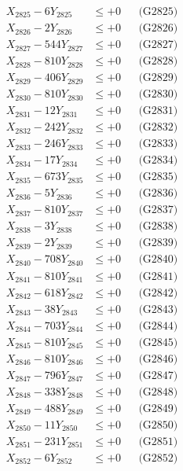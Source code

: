 \documentclass[a4paper,10pt]{article}
\begin{document}
{\begin{align}
X_{2825} - 6Y_{2825} &\leq +0 && \text{(G2825)} \\
X_{2826} - 2Y_{2826} &\leq +0 && \text{(G2826)} \\
X_{2827} - 544Y_{2827} &\leq +0 && \text{(G2827)} \\
X_{2828} - 810Y_{2828} &\leq +0 && \text{(G2828)} \\
X_{2829} - 406Y_{2829} &\leq +0 && \text{(G2829)} \\
X_{2830} - 810Y_{2830} &\leq +0 && \text{(G2830)} \\
\allowbreak
X_{2831} - 12Y_{2831} &\leq +0 && \text{(G2831)} \\
X_{2832} - 242Y_{2832} &\leq +0 && \text{(G2832)} \\
X_{2833} - 246Y_{2833} &\leq +0 && \text{(G2833)} \\
X_{2834} - 17Y_{2834} &\leq +0 && \text{(G2834)} \\
X_{2835} - 673Y_{2835} &\leq +0 && \text{(G2835)} \\
X_{2836} - 5Y_{2836} &\leq +0 && \text{(G2836)} \\
X_{2837} - 810Y_{2837} &\leq +0 && \text{(G2837)} \\
X_{2838} - 3Y_{2838} &\leq +0 && \text{(G2838)} \\
X_{2839} - 2Y_{2839} &\leq +0 && \text{(G2839)} \\
X_{2840} - 708Y_{2840} &\leq +0 && \text{(G2840)} \\
\allowbreak
X_{2841} - 810Y_{2841} &\leq +0 && \text{(G2841)} \\
X_{2842} - 618Y_{2842} &\leq +0 && \text{(G2842)} \\
X_{2843} - 38Y_{2843} &\leq +0 && \text{(G2843)} \\
X_{2844} - 703Y_{2844} &\leq +0 && \text{(G2844)} \\
X_{2845} - 810Y_{2845} &\leq +0 && \text{(G2845)} \\
X_{2846} - 810Y_{2846} &\leq +0 && \text{(G2846)} \\
X_{2847} - 796Y_{2847} &\leq +0 && \text{(G2847)} \\
X_{2848} - 338Y_{2848} &\leq +0 && \text{(G2848)} \\
X_{2849} - 488Y_{2849} &\leq +0 && \text{(G2849)} \\
X_{2850} - 11Y_{2850} &\leq +0 && \text{(G2850)} \\
\allowbreak
X_{2851} - 231Y_{2851} &\leq +0 && \text{(G2851)} \\
X_{2852} - 6Y_{2852} &\leq +0 && \text{(G2852)} \\

\end{align}}
\end{document}
